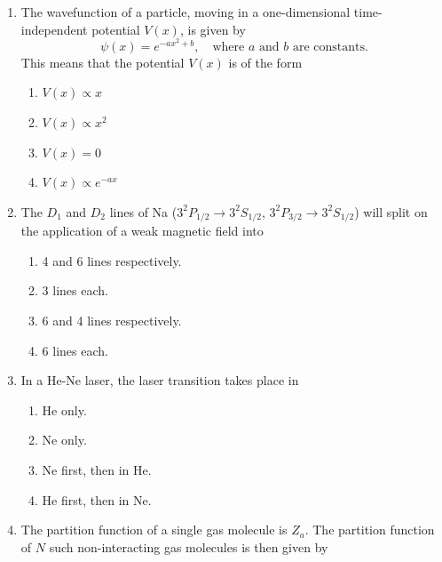 \documentclass[journal,12pt,onecolumn]{IEEEtran}
\begin{document}
\begin{enumerate}[itemsep = 1em]
\item The wavefunction of a particle, moving in a one-dimensional time-independent potential $V(x)$, is given by
\[
\psi(x) = e^{-ax^2 + b}, \quad \text{where $a$ and $b$ are constants.}
\]
This means that the potential $V(x)$ is of the form

\hfill{}


\begin{multicols}{2}
\begin{enumerate}
\item $V(x) \propto x$
\item $V(x) \propto x^2$
\item $V(x) = 0$
\item $V(x) \propto e^{-ax}$
\end{enumerate}
\end{multicols}


\item The $D_1$ and $D_2$ lines of Na ($3^2P_{1/2} \rightarrow 3^2S_{1/2}$, $3^2P_{3/2} \rightarrow 3^2S_{1/2}$) will split on the application of a weak magnetic field into

\hfill{}


\begin{multicols}{2}
\begin{enumerate}
\item 4 and 6 lines respectively.
\item 3 lines each.
\item 6 and 4 lines respectively.
\item 6 lines each.
\end{enumerate}
\end{multicols}


\item In a He-Ne laser, the laser transition takes place in

\hfill{}


\begin{multicols}{2}
\begin{enumerate}
\item He only.
\item Ne only.
\item Ne first, then in He.
\item He first, then in Ne.
\end{enumerate}
\end{multicols}


\item The partition function of a single gas molecule is $Z_a$. The partition function of $N$ such non-interacting gas molecules is then given by


\end{enumerate}
\end{document}
